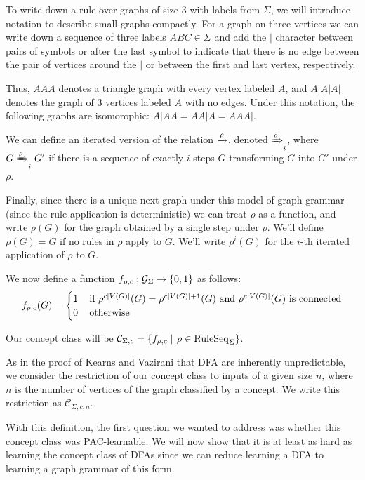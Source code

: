 \documentclass[]{article}
\def\RuleSeq{\mathrm{RuleSeq}\xspace}
\def\Graphs{\mathcal{G}\xspace}
\def\Concepts{\mathcal{C}\xspace}
\begin{document}
To write down a rule over graphs of size $3$ with labels from $\Sigma$, we will
introduce notation to describe small graphs compactly. For a graph on three
vertices we can write down a sequence of three labels $ABC \in \Sigma$ and add
the $|$ character between pairs of symbols or after the last symbol to indicate
that there is no edge between the pair of vertices around the $|$ or between the
first and last vertex, respectively.

Thus, $AAA$ denotes a triangle graph with every vertex labeled $A$, and $A|A|A|$
denotes the graph of 3 vertices labeled $A$ with no edges. Under this notation,
the following graphs are isomorophic: $A|AA = AA|A = AAA|$.

We can define an iterated version of the relation $\xrightarrow{\rho}$, denoted
$\xRightarrow{\rho}_i$, where $G \xRightarrow{\rho}_i G'$ if there is a sequence of exactly
$i$ steps $G$ transforming $G$ into $G'$ under $\rho$.

Finally, since there is a unique next graph under this model of graph grammar
(since the rule application is deterministic) we can treat $\rho$ as a function,
and write $\rho(G)$ for the graph obtained by a single step under $\rho$. We'll
define $\rho(G) =G$ if no rules in $\rho$ apply to $G$. We'll write $\rho^i(G)$
for the $i$-th iterated application of $\rho$ to $G$.

We now define a function $f_{\rho,c} : \Graphs_{\Sigma} \to \Set{0,1}$ as follows:
\[f_{\rho,c}(G) = \begin{cases}
    1 &\,\text{if $\rho^{c\left| V(G) \right|}(G) = \rho^{c\left| V(G) \right|+1}(G)$ and $\rho^{c\left| V(G) \right|}(G)$ is connected}\\
    0 &\,\text{otherwise}
  \end{cases}\]

Our concept class will be
\(\Concepts_{\Sigma,c} = \Setbar{f_{\rho,c}}{\rho\in \RuleSeq_\Sigma}\).

As in the proof of Kearns and Vazirani that DFA are inherently unpredictable, we
consider the restriction of our concept class to inputs of a given size $n$,
where $n$ is the number of vertices of the graph classified by a concept. We
write this restriction as $\Concepts_{\Sigma,c,n}$.

With this definition, the first question we wanted to address was whether this
concept class was PAC-learnable. We will now show that it is at least as
hard as learning the concept class of DFAs since we can reduce learning a DFA to
learning a graph grammar of this form.
\end{document}
